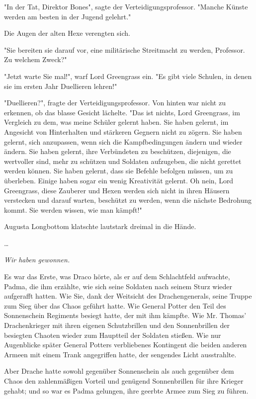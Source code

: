 {"In der Tat, Direktor Bones", sagte der Verteidigungsprofessor. "Manche Künste werden am besten in der Jugend gelehrt."

Die Augen der alten Hexe verengten sich.

"Sie bereiten sie darauf vor, eine militärische Streitmacht zu werden, Professor. Zu welchem Zweck?"

"Jetzt warte Sie mal!", warf Lord Greengrass ein. "Es gibt viele Schulen, in denen sie im ersten Jahr Duellieren lehren!"

"Duellieren?", fragte der Verteidigungsprofessor. Von hinten war nicht zu erkennen, ob das blasse Gesicht lächelte. "Das ist nichts, Lord Greengrass, im Vergleich zu dem, was meine Schüler gelernt haben. Sie haben gelernt, im Angesicht von Hinterhalten und stärkeren Gegnern nicht zu zögern. Sie haben gelernt, sich anzupassen, wenn sich die Kampfbedingungen ändern und wieder ändern. Sie haben gelernt, ihre Verbündeten zu beschützen, diejenigen, die wertvoller sind, mehr zu schützen und Soldaten aufzugeben, die nicht gerettet werden können. Sie haben gelernt, dass sie Befehle befolgen müssen, um zu überleben. Einige haben sogar ein wenig Kreativität gelernt. Oh nein, Lord Greengrass, diese Zauberer und Hexen werden sich nicht in ihren Häusern verstecken und darauf warten, beschützt zu werden, wenn die nächste Bedrohung kommt. Sie werden wissen, wie man kämpft!"

Augusta Longbottom klatschte lautstark dreimal in die Hände.

…

\emph{Wir haben gewonnen.}

Es war das Erste, was Draco hörte, als er auf dem Schlachtfeld aufwachte, Padma, die ihm erzählte, wie sich seine Soldaten nach seinem Sturz wieder aufgerafft hatten. Wie Sie, dank der Weitsicht des Drachengenerals, seine Truppe zum Sieg über das Chaos geführt hatte. Wie General Potter den Teil des Sonnenschein Regiments besiegt hatte, der mit ihm kämpfte. Wie Mr. Thomas' Drachenkrieger mit ihren eigenen Schutzbrillen und den Sonnenbrillen der besiegten Chaoten wieder zum Hauptteil der Soldaten stießen. Wie nur Augenblicke später General Potters verbliebenes Kontingent die beiden anderen Armeen mit einem Trank angegriffen hatte, der sengendes Licht ausstrahlte.

Aber Drache hatte sowohl gegenüber Sonnenschein als auch gegenüber dem Chaos den zahlenmäßigen Vorteil und genügend Sonnenbrillen für ihre Krieger gehabt; und so war es Padma gelungen, ihre geerbte Armee zum Sieg zu führen.

}
